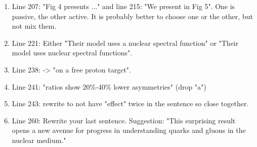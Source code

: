 \documentclass[a4paper,11pt,twoside]{article}
\begin{document}
\begin{enumerate}
\item    Line 207: "Fig 4 presents ..." and line 215: "We present in Fig 5". 
   One is passive, the other active. It is probably better to choose one or the 
      other, but not mix them.\\
   \textcolor{blue}{ }

\item    Line 221: Either "Their model uses a nuclear spectral function" or 
   "Their model uses nuclear spectral functions".\\
   \textcolor{blue}{ }

\item    Line 238: -> "on a free proton target".\\
   \textcolor{blue}{ }

\item    Line 241: "ratios show 20\%-40\% lower asymmetries" (drop "a")\\
   \textcolor{blue}{ }

\item    Line 243: rewrite to not have "effect" twice in the sentence so close together.\\
   \textcolor{blue}{ }

\item    Line 260: Rewrite your last sentence. Suggestion: "This surprising 
   result opens a new avenue for progress in understanding quarks and gluons in 
      the nuclear medium."\\
   \textcolor{blue}{ }  
  
\end{enumerate}
\end{document}
